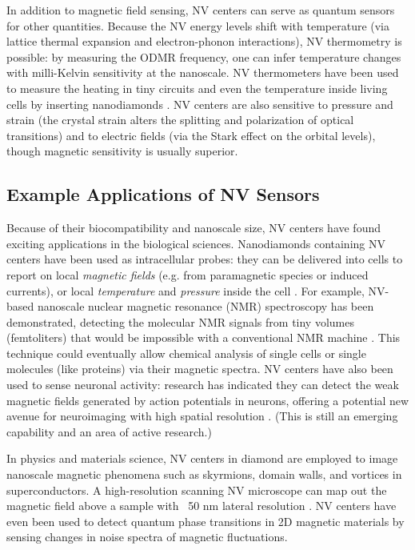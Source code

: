 In addition to magnetic field sensing, NV centers can serve as quantum
sensors for other quantities. Because the NV energy levels shift with
temperature (via lattice thermal expansion and electron-phonon
interactions), NV thermometry is possible: by measuring the ODMR
frequency, one can infer temperature changes with milli-Kelvin
sensitivity at the nanoscale. NV thermometers have been used to
measure the heating in tiny circuits and even the temperature inside
living cells by inserting nanodiamonds . NV centers are also sensitive
to pressure and strain (the crystal strain alters the splitting and
polarization of optical transitions) and to electric fields (via the
Stark effect on the orbital levels), though magnetic sensitivity is
usually superior.



\subsection*{Example Applications of NV Sensors}

Because of their biocompatibility and nanoscale size, NV centers have
found exciting applications in the biological sciences. Nanodiamonds
containing NV centers have been used as intracellular probes: they can
be delivered into cells to report on local \textit{magnetic fields}
(e.g. from paramagnetic species or induced currents), or local
\textit{temperature} and \textit{pressure} inside the cell . For
example, NV-based nanoscale nuclear magnetic resonance (NMR)
spectroscopy has been demonstrated, detecting the molecular NMR
signals from tiny volumes (femtoliters) that would be impossible with
a conventional NMR machine . This technique could eventually allow
chemical analysis of single cells or single molecules (like proteins)
via their magnetic spectra. NV centers have also been used to sense
neuronal activity: research has indicated they can detect the weak
magnetic fields generated by action potentials in neurons, offering a
potential new avenue for neuroimaging with high spatial resolution
. (This is still an emerging capability and an area of active
research.)



In physics and materials science, NV centers in diamond are employed
to image nanoscale magnetic phenomena such as skyrmions, domain walls,
and vortices in superconductors. A high-resolution scanning NV
microscope can map out the magnetic field above a sample with ~50 nm
lateral resolution . NV centers have even been used to detect quantum
phase transitions in 2D magnetic materials by sensing changes in noise
spectra of magnetic fluctuations.



